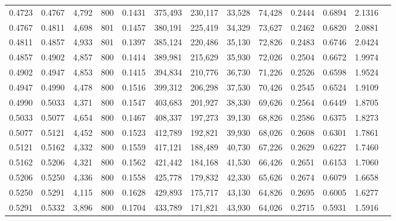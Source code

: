 \begin{tabular}{rrrrrrrrrrrrr}
0.4723 & 0.4767 &  4,792 &   800 &                                     0.1431 & 375,493 & 230,117 &  33,528 &  74,428 & 0.2444 & 0.6894 & 2.1316 \\
0.4767 & 0.4811 &  4,698 &   801 &                                     0.1457 & 380,191 & 225,419 &  34,329 &  73,627 & 0.2462 & 0.6820 & 2.0881 \\
0.4811 & 0.4857 &  4,933 &   801 &                                     0.1397 & 385,124 & 220,486 &  35,130 &  72,826 & 0.2483 & 0.6746 & 2.0424 \\
0.4857 & 0.4902 &  4,857 &   800 &                                     0.1414 & 389,981 & 215,629 &  35,930 &  72,026 & 0.2504 & 0.6672 & 1.9974 \\
0.4902 & 0.4947 &  4,853 &   800 &                                     0.1415 & 394,834 & 210,776 &  36,730 &  71,226 & 0.2526 & 0.6598 & 1.9524 \\
0.4947 & 0.4990 &  4,478 &   800 &                                     0.1516 & 399,312 & 206,298 &  37,530 &  70,426 & 0.2545 & 0.6524 & 1.9109 \\
0.4990 & 0.5033 &  4,371 &   800 &                                     0.1547 & 403,683 & 201,927 &  38,330 &  69,626 & 0.2564 & 0.6449 & 1.8705 \\
0.5033 & 0.5077 &  4,654 &   800 &                                     0.1467 & 408,337 & 197,273 &  39,130 &  68,826 & 0.2586 & 0.6375 & 1.8273 \\
0.5077 & 0.5121 &  4,452 &   800 &                                     0.1523 & 412,789 & 192,821 &  39,930 &  68,026 & 0.2608 & 0.6301 & 1.7861 \\
0.5121 & 0.5162 &  4,332 &   800 &                                     0.1559 & 417,121 & 188,489 &  40,730 &  67,226 & 0.2629 & 0.6227 & 1.7460 \\
0.5162 & 0.5206 &  4,321 &   800 &                                     0.1562 & 421,442 & 184,168 &  41,530 &  66,426 & 0.2651 & 0.6153 & 1.7060 \\
0.5206 & 0.5250 &  4,336 &   800 &                                     0.1558 & 425,778 & 179,832 &  42,330 &  65,626 & 0.2674 & 0.6079 & 1.6658 \\
0.5250 & 0.5291 &  4,115 &   800 &                                     0.1628 & 429,893 & 175,717 &  43,130 &  64,826 & 0.2695 & 0.6005 & 1.6277 \\
0.5291 & 0.5332 &  3,896 &   800 &                                     0.1704 & 433,789 & 171,821 &  43,930 &  64,026 & 0.2715 & 0.5931 & 1.5916 \\

\end{tabular}
